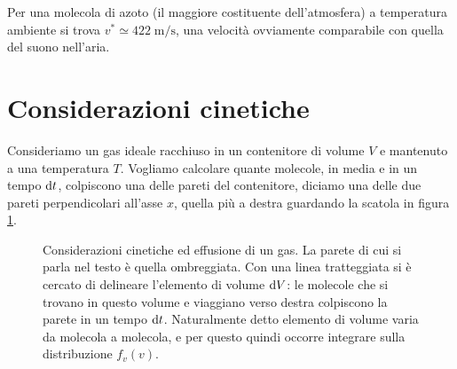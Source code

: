 Per una molecola di azoto (il maggiore costituente dell'atmosfera) a temperatura ambiente si trova $v^{*} \simeq 422\;\mbox{m/s}$, una velocità ovviamente comparabile con quella del suono nell'aria.

\section{Considerazioni cinetiche}
\label{sec:conskin}

Consideriamo un gas ideale racchiuso in un contenitore di volume $V$ e mantenuto a una temperatura $T$. Vogliamo calcolare quante molecole, in media e in un tempo ${\textrm d}t$, colpiscono una delle pareti del contenitore, diciamo una delle due pareti perpendicolari all'asse $x$, quella più a destra guardando la scatola in figura \ref{fig:04-effusione}.
\begin{figure}[h!b]
  \label{fig:04-effusione}
  \centering
  
  \caption{Considerazioni cinetiche ed effusione di un gas. La parete di cui si parla nel testo è quella ombreggiata. Con una linea tratteggiata si è cercato di delineare l'elemento di volume ${\textrm d}V$: le molecole che si trovano in questo volume e viaggiano verso destra colpiscono la parete in un tempo ${\textrm d}t$. Naturalmente detto elemento di volume varia da molecola a molecola, e per questo quindi occorre integrare sulla distribuzione $f_v(v)$.}
\end{figure}


